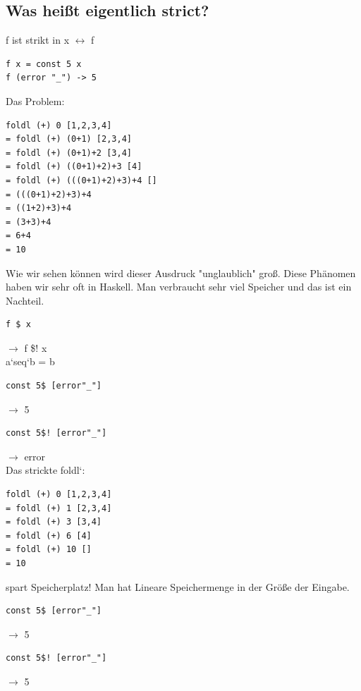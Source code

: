 \documentclass[ngerman,a4paper]{report}
\begin{document}
\subsection{Was heißt eigentlich strict?}
f ist strikt in x $\leftrightarrow$ f %
\begin{lstlisting}
f x = const 5 x 
f (error "_") -> 5
\end{lstlisting}

Das Problem:
\begin{lstlisting}
foldl (+) 0 [1,2,3,4]
= foldl (+) (0+1) [2,3,4]
= foldl (+) (0+1)+2 [3,4]
= foldl (+) ((0+1)+2)+3 [4]
= foldl (+) (((0+1)+2)+3)+4 []
= (((0+1)+2)+3)+4
= ((1+2)+3)+4
= (3+3)+4
= 6+4
= 10
\end{lstlisting}

Wie wir sehen können wird dieser Ausdruck "unglaublich" groß. Diese Phänomen haben wir sehr oft in Haskell. Man verbraucht sehr viel Speicher und das ist ein Nachteil.

\begin{lstlisting}
f $ x
\end{lstlisting}
$\rightarrow$ f \$! x\\

a`seq`b = b

\begin{lstlisting}
const 5$ [error"_"]
\end{lstlisting}
$\rightarrow$ 5

\begin{lstlisting}
const 5$! [error"_"]
\end{lstlisting}
$\rightarrow$ error\\

Das strickte foldl`:
\begin{lstlisting}
foldl (+) 0 [1,2,3,4]
= foldl (+) 1 [2,3,4]
= foldl (+) 3 [3,4]
= foldl (+) 6 [4]
= foldl (+) 10 []
= 10
\end{lstlisting}
spart Speicherplatz! Man hat Lineare Speichermenge in der Größe der Eingabe.\\

\begin{lstlisting}
const 5$ [error"_"]
\end{lstlisting}
$\rightarrow$ 5

\begin{lstlisting}
const 5$! [error"_"]
\end{lstlisting}
$\rightarrow$ 5\\
\end{document}
